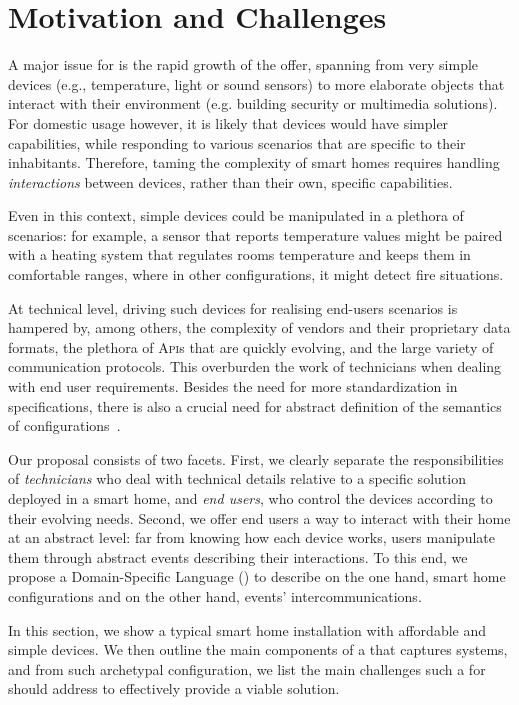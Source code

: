 \section{Motivation and Challenges}
\label{sec:Motivation}

A major issue for \IOT is the rapid growth of the offer, spanning from very simple devices (e.g., temperature, light or sound sensors) to more elaborate objects that interact with their environment (e.g. building security or multimedia solutions). For domestic usage however, it is likely that devices would have simpler capabilities, while responding to various scenarios that are specific to their inhabitants. Therefore, taming the complexity of smart homes requires handling \emph{interactions} between devices, rather than their own, specific capabilities. 

Even in this context, simple devices could be manipulated in a plethora of scenarios: for example, a sensor that reports temperature values might be paired with a heating system that regulates rooms temperature and keeps them in comfortable ranges, where in other configurations, it might detect fire situations. 

At technical level, driving such devices for realising end-users scenarios is hampered by, among others, the complexity of vendors and their proprietary data formats, the plethora of \textsc{Api}s that are quickly evolving, and the large variety of communication protocols. This overburden the work of \IOT technicians when dealing with end user requirements. Besides the need for more standardization in \IOT specifications, there is also a crucial need for abstract definition of the semantics of \IOT configurations~\cite{park-16}.

Our proposal consists of two facets. First, we clearly separate the responsibilities of  \emph{technicians} who deal with technical details relative to a specific solution deployed in a smart home, and \emph{end users}, who control the devices according to their evolving needs. Second, we offer end users a way to interact with their home at an abstract level: far from knowing how each device works, users manipulate them through abstract events describing their interactions. To this end, we propose a Domain-Specific Language (\DSL) to describe on the one hand, smart home configurations and on the other hand, events' intercommunications.

In this section, we show a typical smart home installation with affordable and simple devices. We then outline the main components of a \DSL that captures \IOT systems, and from such archetypal configuration, we list the main challenges such a \DSL for \IOT should address to effectively provide a viable solution.




